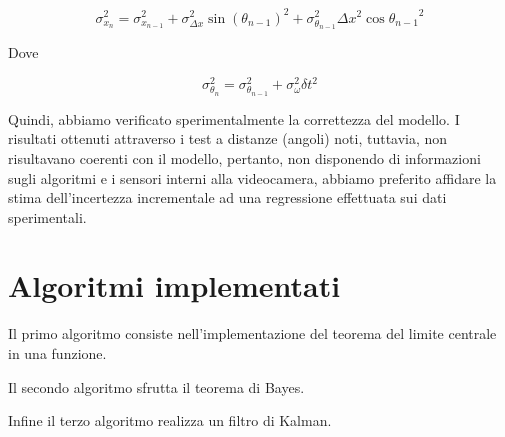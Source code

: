 \documentclass[
	a4paper, %
	10pt, %
]{LTJournalArticle}
\begin{document}
\begin{equation}
        \sigma_{x_n}^2 = \sigma_{x_{n-1}}^2 + \sigma_{\Delta x}^2 \sin{(\theta_{n-1})}^2 + \sigma_{\theta_{n-1}}^2 \Delta x ^2 \cos{\theta_{n-1}}^2
        \label{eq:prop}
\end{equation}

Dove

\begin{equation}
    \sigma_{\theta_{n}}^2 = \sigma_{\theta_{n-1}}^2 + \sigma_{\omega}^2 \delta t^2
    \label{eq:angleprop}
\end{equation}

Quindi, abbiamo verificato sperimentalmente la correttezza del modello. I risultati ottenuti attraverso i test a distanze (angoli) noti, tuttavia, non risultavano coerenti con il modello, pertanto, non disponendo di informazioni sugli algoritmi e i sensori interni alla videocamera, abbiamo preferito affidare la stima dell'incertezza incrementale ad una regressione effettuata sui dati sperimentali.

\section{Algoritmi implementati}

Il primo algoritmo consiste nell'implementazione del teorema del limite centrale in una funzione.

Il secondo algoritmo sfrutta il teorema di Bayes.

Infine il terzo algoritmo realizza un filtro di Kalman.


\printbibliography %

\end{document}
